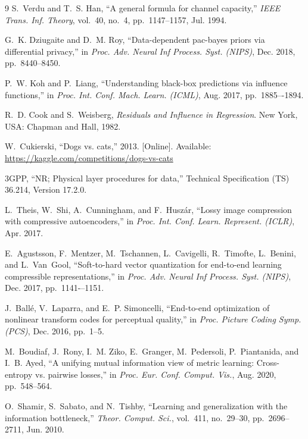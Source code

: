 \documentclass[lettersize,journal]{IEEEtran}
\theoremstyle{definition}
\theoremstyle{plain}
\begin{document}
\begin{thebibliography}{9}
S.~Verdu and T.~S. Han, ``A general formula for channel capacity,'' \emph{IEEE Trans. Inf. Theory}, vol.~40, no.~4, pp.~1147--1157, Jul. 1994.

G.~K. Dziugaite and D.~M. Roy, ``Data-dependent pac-bayes priors via differential privacy,'' in \emph{Proc. Adv. Neural Inf Process. Syst. (NIPS)}, Dec. 2018, pp.~8440--8450.

P.~W. Koh and P.~Liang, ``Understanding black-box predictions via influence functions,'' in \emph{Proc. Int. Conf. Mach. Learn. (ICML)}, Aug. 2017, pp.~1885–-1894.

R.~D. Cook and S.~Weisberg, \emph{Residuals and Influence in Regression}. New York, USA: Chapman and Hall, 1982.


W.~Cukierski, ``Dogs vs. cats,'' 2013. [Online]. Available: \url{https://kaggle.com/competitions/dogs-vs-cats}

3GPP, ``{NR; Physical layer procedures for data},'' Technical Specification (TS) 36.214,
\newblock Version 17.2.0.

L.~Theis, W.~Shi, A.~Cunningham, and F.~Husz{\'a}r, ``Lossy image compression with compressive autoencoders,'' in \emph{Proc. Int. Conf. Learn. Represent. (ICLR)}, Apr. 2017.

E.~Agustsson, F.~Mentzer, M.~Tschannen, L.~Cavigelli, R.~Timofte, L.~Benini, and L.~Van~Gool, ``Soft-to-hard vector quantization for end-to-end learning compressible representations,'' in \emph{Proc. Adv. Neural Inf Process. Syst. (NIPS)}, Dec. 2017, pp.~1141-–1151.

J.~Ballé, V.~Laparra, and E.~P. Simoncelli, ``End-to-end optimization of nonlinear transform codes for perceptual quality,'' in \emph{Proc. Picture Coding Symp. (PCS)}, Dec. 2016, pp.~1--5.

M.~Boudiaf, J.~Rony, I.~M. Ziko, E.~Granger, M.~Pedersoli, P.~Piantanida, and I.~B. Ayed, ``A unifying mutual information view of metric learning: Cross-entropy vs. pairwise losses,'' in \emph{Proc. Eur. Conf. Comput. Vis.}, Aug. 2020, pp.~548--564.

O.~Shamir, S.~Sabato, and N.~Tishby, ``Learning and generalization with the information bottleneck,'' \emph{Theor. Comput. Sci.}, vol.~411, no.~29--30, pp.~2696--2711, Jun. 2010.


\end{thebibliography}
\end{document}
